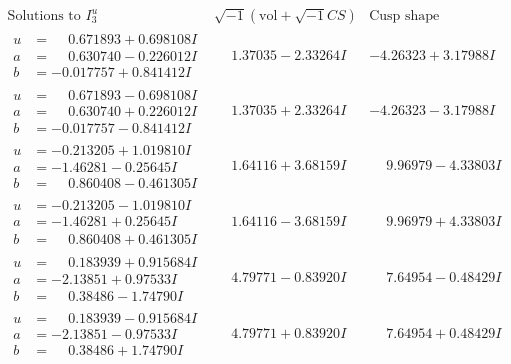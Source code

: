 \documentclass[1p]{elsarticle_modified}
\theoremstyle{definition}
\newcommand{\I}{\sqrt{-1}}
\begin{document}
$$\begin{array}{c|c|c}  
\text{Solutions to }I^u_{3}& \I (\text{vol} + \sqrt{-1}CS) & \text{Cusp shape}\\
 \hline 
\begin{aligned}
u &= \phantom{-}0.671893 + 0.698108 I \\
a &= \phantom{-}0.630740 - 0.226012 I \\
b &= -0.017757 + 0.841412 I\end{aligned}
 & \phantom{-}1.37035 - 2.33264 I & -4.26323 + 3.17988 I \\ \hline\begin{aligned}
u &= \phantom{-}0.671893 - 0.698108 I \\
a &= \phantom{-}0.630740 + 0.226012 I \\
b &= -0.017757 - 0.841412 I\end{aligned}
 & \phantom{-}1.37035 + 2.33264 I & -4.26323 - 3.17988 I \\ \hline\begin{aligned}
u &= -0.213205 + 1.019810 I \\
a &= -1.46281 - 0.25645 I \\
b &= \phantom{-}0.860408 - 0.461305 I\end{aligned}
 & \phantom{-}1.64116 + 3.68159 I & \phantom{-}9.96979 - 4.33803 I \\ \hline\begin{aligned}
u &= -0.213205 - 1.019810 I \\
a &= -1.46281 + 0.25645 I \\
b &= \phantom{-}0.860408 + 0.461305 I\end{aligned}
 & \phantom{-}1.64116 - 3.68159 I & \phantom{-}9.96979 + 4.33803 I \\ \hline\begin{aligned}
u &= \phantom{-}0.183939 + 0.915684 I \\
a &= -2.13851 + 0.97533 I \\
b &= \phantom{-}0.38486 - 1.74790 I\end{aligned}
 & \phantom{-}4.79771 - 0.83920 I & \phantom{-}7.64954 - 0.48429 I \\ \hline\begin{aligned}
u &= \phantom{-}0.183939 - 0.915684 I \\
a &= -2.13851 - 0.97533 I \\
b &= \phantom{-}0.38486 + 1.74790 I\end{aligned}
 & \phantom{-}4.79771 + 0.83920 I & \phantom{-}7.64954 + 0.48429 I \\ \hline\begin{aligned}

\end{aligned}
\end{array}$$
\end{document}
